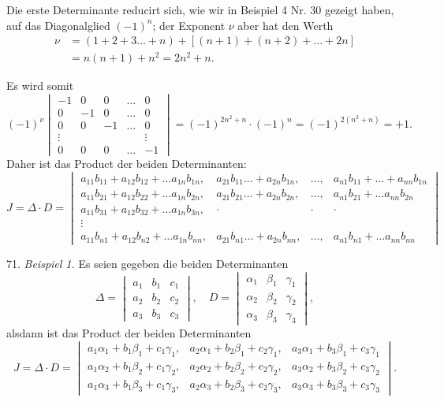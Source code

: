 Die erste Determinante reducirt sich, wie wir in Beispiel 4 Nr. 30
gezeigt haben, auf das Diagonalglied $(-1)^n$; der Exponent $\nu$ aber
hat den Werth
\[
\begin{aligned}
\nu &= (1+2+3\dots+n)+[(n+1)+(n+2)+\dots+2n] \\
&= n(n+1)+n^2 = 2n^2+n.
\end{aligned}
\]


Es wird somit
\[
(-1)^{\nu}
\begin{vmatrix}
-1 & 0 & 0 & \dots & 0 \\
0 & -1 & 0 & \dots & 0 \\
0 & 0 & -1 & \dots & 0 \\
\vdots & & & & \vdots \\
0 & 0 & 0 & \dots & -1
\end{vmatrix}
= (-1)^{2n^2+n} \cdot (-1)^n = (-1)^{2(n^2+n)} = +1.
\]
Daher ist das Product der beiden Determinanten:
\[
J = \Delta \cdot D =
\begin{vmatrix}
a_{11}b_{11}+a_{12}b_{12}+\dots a_{1n}b_{1n}, & a_{21}b_{11}\dots+a_{2n}b_{1n}, & \dots, & a_{n1}b_{11}+\dots+a_{nn}b_{1n} \\
a_{11}b_{21}+a_{12}b_{22}+\dots a_{1n}b_{2n}, & a_{21}b_{21}\dots+a_{2n}b_{2n}, & \dots, & a_{n1}b_{21}+\dots a_{nn}b_{2n} \\
a_{11}b_{31}+a_{12}b_{32}+\dots a_{1n}b_{3n}, & \cdot & \cdot & \cdot \\
\vdots & & & \\
a_{11}b_{n1}+a_{12}b_{n2}+\dots a_{1n}b_{nn}, & a_{21}b_{n1}\dots+a_{2n}b_{nn}, & \dots, & a_{n1}b_{n1}+\dots a_{nn}b_{nn}
\end{vmatrix}
\]

71. \textit{Beispiel 1.} Es seien gegeben die beiden Determinanten
\[
\Delta = \begin{vmatrix} a_1 & b_1 & c_1 \\ a_2 & b_2 & c_2 \\ a_3 & b_3 & c_3 \end{vmatrix}, \quad
D = \begin{vmatrix} \alpha_1 & \beta_1 & \gamma_1 \\ \alpha_2 & \beta_2 & \gamma_2 \\ \alpha_3 & \beta_3 & \gamma_3 \end{vmatrix},
\]
alsdann ist das Product der beiden Determinanten
\[
J = \Delta \cdot D =
\begin{vmatrix}
a_1\alpha_1+b_1\beta_1+c_1\gamma_1, & a_2\alpha_1+b_2\beta_1+c_2\gamma_1, & a_3\alpha_1+b_3\beta_1+c_3\gamma_1 \\
a_1\alpha_2+b_1\beta_2+c_1\gamma_2, & a_2\alpha_2+b_2\beta_2+c_2\gamma_2, & a_3\alpha_2+b_3\beta_2+c_3\gamma_2 \\
a_1\alpha_3+b_1\beta_3+c_1\gamma_3, & a_2\alpha_3+b_2\beta_3+c_2\gamma_3, & a_3\alpha_3+b_3\beta_3+c_3\gamma_3
\end{vmatrix}.
\]

